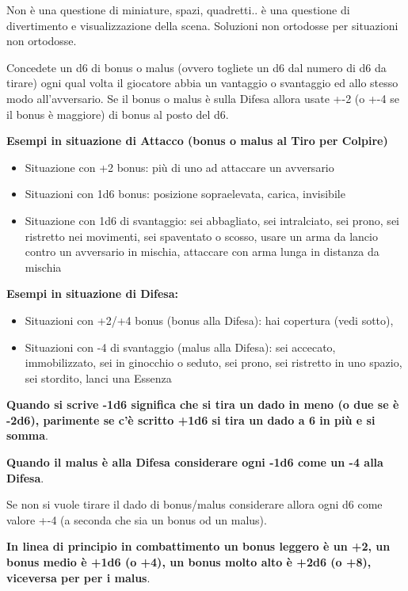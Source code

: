 \documentclass[a4paper,11pt,twoside,openany]{book}
\begin{document}
Non è una questione di miniature, spazi, quadretti.. è una questione di divertimento e visualizzazione della scena. Soluzioni non ortodosse per situazioni non ortodosse.

Concedete un d6 di bonus o malus (ovvero togliete un d6 dal numero di d6 da tirare) ogni qual volta il giocatore abbia un vantaggio o svantaggio ed allo stesso modo all'avversario. Se il bonus o malus è sulla Difesa allora usate +-2 (o +-4 se il bonus è maggiore) di bonus al posto del d6.

\bigskip

\textbf{Esempi in situazione di Attacco (bonus o malus al Tiro per Colpire)}

\begin{itemize}
	\item Situazione con +2 bonus: più di uno ad attaccare un avversario

	\item Situazioni con 1d6 bonus: posizione sopraelevata, carica, invisibile

	\item Situazione con 1d6 di svantaggio: sei abbagliato, sei intralciato, sei prono, sei ristretto nei movimenti, sei spaventato o scosso, usare un arma da lancio contro un avversario in mischia, attaccare con arma lunga in distanza da mischia
\end{itemize}

\textbf{Esempi in situazione di Difesa:}

\begin{itemize}
	\item Situazioni con +2/+4 bonus (bonus alla Difesa): hai copertura (vedi sotto),

	\item Situazioni con -4 di svantaggio (malus alla Difesa): sei accecato, immobilizzato, sei in ginocchio o seduto, sei prono, sei ristretto in uno spazio, sei stordito, lanci una Essenza 
\end{itemize}

\textbf{Quando si scrive -1d6 significa che si tira un dado in meno (o due se è -2d6), parimente se c'è scritto +1d6 si tira un dado a 6 in più e si somma}.

\textbf{Quando il malus è alla Difesa considerare ogni -1d6 come un -4 alla Difesa}.

Se non si vuole tirare il dado di bonus/malus considerare allora ogni d6 come valore +-4 (a seconda che sia un bonus od un malus).

\textbf{In linea di principio in combattimento un bonus leggero è un +2, un bonus medio è +1d6 (o +4), un bonus molto alto è +2d6 (o +8), viceversa per per i malus}.
\end{document}
